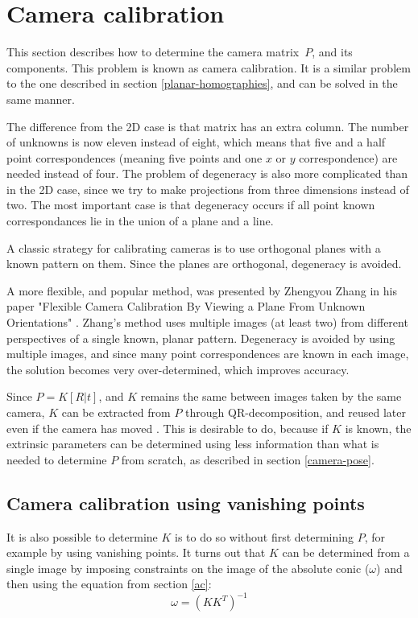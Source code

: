 \section{Camera calibration} \label{camera-calibration}
This section describes how to determine the camera matrix $P$, and its components.
This problem is known as camera calibration.
It is a similar problem to the one described in section \ref{planar-homographies}, and can be solved in the same manner.

The difference from the 2D case is that matrix has an extra column. The number of unknowns is now eleven instead of eight, which means that five and a half point correspondences (meaning five points and one $x$ or $y$ correspondence) are needed instead of four.
The problem of degeneracy is also more complicated than in the 2D case, since we try to make projections from three dimensions instead of two.
The most important case is that degeneracy occurs if all point known correspondances lie in the union of a plane and a line. \cite[179-180]{hartley-zisserman}

A classic strategy for calibrating cameras is to use orthogonal planes with a known pattern on them. 
Since the planes are orthogonal, degeneracy is avoided.

A more flexible, and popular method, was presented by Zhengyou Zhang in his paper "Flexible Camera Calibration By Viewing a Plane From Unknown Orientations" \cite{zhang-calibration}.
Zhang's method uses multiple images (at least two) from different perspectives of a single known, planar pattern.
Degeneracy is avoided by using multiple images, and since many point correspondences are known in each image, the solution becomes very over-determined, which improves accuracy.

Since $P=K[R|t]$, and $K$ remains the same between images taken by the same camera, $K$ can be extracted from $P$ through QR-decomposition, and reused later even if the camera has moved \cite{wiki:qr-decomposition}. 
This is desirable to do, because if $K$ is known, the extrinsic parameters can be determined using less information than what is needed to determine $P$ from scratch, as described in section \ref{camera-pose}.

\subsection{Camera calibration using vanishing points} \label{background:vanishing_point_calibration}
It is also possible to determine $K$ is to do so without first determining $P$, for example by using vanishing points.
It turns out that $K$ can be determined from a single image by imposing constraints on the image of the absolute conic ($\omega$) and then using the equation from section \ref{ac}:
\begin{equation} \label{eq:conic_k}
	\omega = (KK^T)^{-1}
\end{equation}

